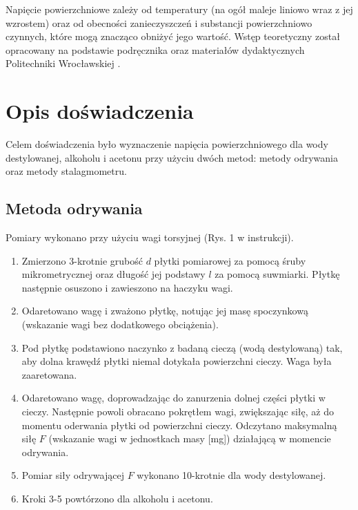 \documentclass[a4paper,12pt]{article}
\begin{document}
Napięcie powierzchniowe zależy od temperatury (na ogół maleje liniowo wraz z jej wzrostem) oraz od obecności zanieczyszczeń i substancji powierzchniowo czynnych, które mogą znacząco obniżyć jego wartość.
Wstęp teoretyczny został opracowany na podstawie podręcznika \cite{fizyka_dla_szkół_wyższych_tom_2} oraz materiałów dydaktycznych Politechniki Wrocławskiej \cite{lab12_pwr}.
\section{Opis doświadczenia}

Celem doświadczenia było wyznaczenie napięcia powierzchniowego dla wody destylowanej, alkoholu i acetonu przy użyciu dwóch metod: metody odrywania oraz metody stalagmometru.
\subsection{Metoda odrywania}

Pomiary wykonano przy użyciu wagi torsyjnej (Rys. 1 w instrukcji).
\begin{enumerate}
    \item Zmierzono 3-krotnie grubość $d$ płytki pomiarowej za pomocą śruby mikrometrycznej oraz długość jej podstawy $l$ za pomocą suwmiarki.
          Płytkę następnie osuszono i zawieszono na haczyku wagi.
    \item Odaretowano wagę i zważono płytkę, notując jej masę spoczynkową (wskazanie wagi bez dodatkowego obciążenia).
    \item Pod płytkę podstawiono naczynko z badaną cieczą (wodą destylowaną) tak, aby dolna krawędź płytki niemal dotykała powierzchni cieczy.
          Waga była zaaretowana.
    \item Odaretowano wagę, doprowadzając do zanurzenia dolnej części płytki w cieczy.
          Następnie powoli obracano pokrętłem wagi, zwiększając siłę, aż do momentu oderwania płytki od powierzchni cieczy.
          Odczytano maksymalną siłę $F$ (wskazanie wagi w jednostkach masy [mg]) działającą w momencie odrywania.
    \item Pomiar siły odrywającej $F$ wykonano 10-krotnie dla wody destylowanej.
    \item Kroki 3-5 powtórzono dla alkoholu i acetonu.
\end{enumerate}
\end{document}
